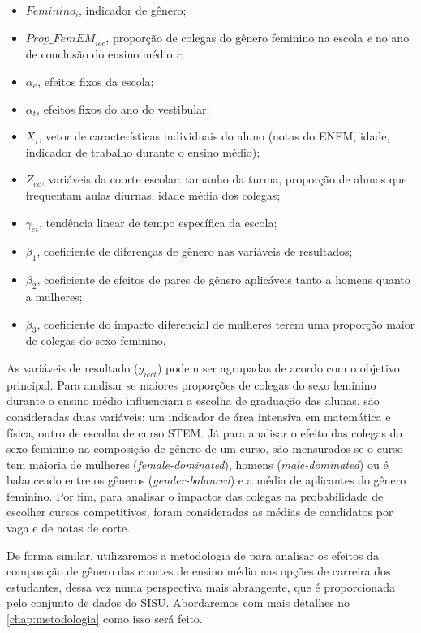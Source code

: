 \begin{itemize}
  \item $\textit{Feminino}_i$, indicador de gênero;
  \item $\textit{Prop\_FemEM}_{iec}$, proporção de colegas do gênero feminino na escola \textit{e} no ano de conclusão do ensino médio \textit{c};
  \item $\alpha_e$, efeitos fixos da escola;
  \item $\alpha_t$, efeitos fixos do ano do vestibular;
  \item $X_i$, vetor de características individuais do aluno (notas do ENEM, idade, indicador de trabalho durante o ensino médio);
  \item $Z_{ec}$, variáveis da coorte escolar: tamanho da turma, proporção de alunos que frequentam aulas diurnas, idade média dos colegas;
  \item $\gamma_{et}$, tendência linear de tempo específica da escola;
  \item $\beta_1$, coeficiente de diferenças de gênero nas variáveis de resultados;
  \item $\beta_2$, coeficiente de efeitos de pares de gênero aplicáveis tanto a homens quanto a mulheres;
  \item $\beta_3$, coeficiente do impacto diferencial de mulheres terem uma proporção maior de colegas do sexo feminino.
\end{itemize}

As variáveis de resultado ($y_{iect}$) podem ser agrupadas de acordo com o objetivo principal. Para analisar se maiores proporções de colegas do sexo feminino durante o ensino médio influenciam a escolha de graduação das alunas, são consideradas duas variáveis: um indicador de área intensiva em matemática e física, outro de escolha de curso STEM.  Já para analisar o efeito das colegas do sexo feminino na composição de gênero de um curso, são mensurados se o curso tem maioria de mulheres (\textit{female-dominated}), homens (\textit{male-dominated}) ou é balanceado entre os gêneros (\textit{gender-balanced}) e a média de aplicantes do gênero feminino. Por fim, para analisar o impactos das colegas na probabilidade de escolher cursos competitivos, foram consideradas as médias de candidatos por vaga e de notas de corte.

De forma similar, utilizaremos a metodologia de \citet{Borges2021} para analisar os efeitos da composição de gênero das coortes de ensino médio nas opções de carreira dos estudantes, dessa vez numa perspectiva mais abrangente, que é proporcionada pelo conjunto de dados do SISU. Abordaremos com mais detalhes no \autoref{chap:metodologia} como isso será feito.
